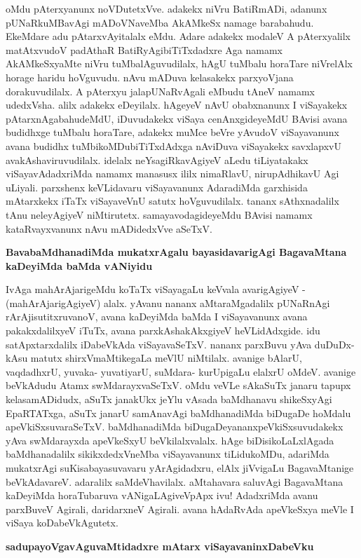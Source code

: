 \noindent
oMdu pAterxyanunx noVDutetxVve. adakekx niVru BatiRmADi, adanunx pUNaRkuMBavAgi mADoVNa\-veMba AkAMkeSx namage barabahudu. EkeMdare adu pAtarxvAyitalalx eMdu. Adare adakekx modaleV A pAterxyalilx matAtxvudoV padAthaR BatiRyAgibiTiTxdadxre Aga namamx AkAMkeSxyaMte niVru tuMbalAguvu\-dilalx, hAgU tuMbalu horaTare niVrelAlx horage haridu hoVguvudu. nAvu mADuva kela\-sakekx parxyoVjana dorakuvudilalx. A pAterxyu jalapUNaRvAgali eMbudu tAneV namamx udedxVsha. alilx adakekx eDeyilalx. hAgeyeV nAvU obabxnanunx I viSayakekx pAtarxnAgabahudeMdU, iDuvudakekx viSaya cenAnx\-gideyeMdU BAvisi avana budidhxge tuMbalu horaTare, adakekx muMce beVre yAvudoV viSayavanunx avana budidhx tuMbikoMDubiTiTxdAdxga nAviDuva viSayakekx savxlapxvU avakAshaviruvudilalx. idelalx neYsa\-giRkavAgiyeV aLedu tiLiyatakakx viSayavAdadxriMda namamx manasusx ililx nimaRlavU, nirupAdhikavU Agi uLiyali. parxshenx keVLidavaru viSayavanunx AdaradiMda garxhisida mAtarxkekx iTaTx viSayaveVnU satutx hoVguvudilalx. tananx sAthxnadalilx tAnu neleyAgiyeV niMtirutetx. samayavodagideyeMdu BAvisi namamx kataRvayxvanunx nAvu mADidedxVve aSeTxV.

{\bigskip
\noindent
{\large\bf BavabaMdhanadiMda mukatxrAgalu bayasidavarigAgi BagavaMtana kaDeyiMda baMda vANiyidu}}\label{page251}
\medskip

\noindent
IvAga mahArAjarigeMdu koTaTx viSayagaLu keVvala avarigAgiyeV - (mahArAjarigAgiyeV) alalx. yAvanu nananx aMtaraMgadalilx pUNaRnAgi rArAjisutitxruvanoV, avana kaDeyiMda baMda I viSayavanunx avana pakakxdalilxyeV iTuTx, avana parxkAshakAkxgiyeV heVLidAdxgide. idu satApxtarxdalilx iDabeVkAda viSayavaSeTxV. nananx parxBuvu yAva duDuDx- kAsu matutx shirxVmaMtikegaLa meVlU niMtilalx. avanige bAlarU, vaqdadhxrU, yuvaka- yuvatiyarU, suMdara- kurUpigaLu elalxrU oMdeV. avanige beVkAdudu Atamx swMdarayxvaSeTxV. oMdu veVLe sAkaSuTx janaru tapupx kelasamADidudx, aSuTx janakUkx jeYlu vAsada baMdhanavu shikeSxyAgi EpaR\-TATxga, aSuTx janarU samAnavAgi baMdhanadiMda biDugaDe hoMdalu apeVkiSxsuvaraSeTxV. baMdhanadiMda biDugaDeyananxpeVkiSxsuvudakekx yAva swMdarayxda apeVkeSxyU beVkilalxvalalx. hAge biDisikoLaLxlAgada baMdha\-nadalilx sikikxdedxVneMba viSayavanunx tiLidukoMDu, adariMda mukatxrAgi suKisabayasuvavaru yArA\-gidadxru, elAlx jiVvigaLu BagavaMtanige beVkAdavareV. adaralilx saMdeVhavilalx. aMtahavara saluvAgi Baga\-vaMtana kaDeyiMda horaTubaruva vANigaLAgiveVpApx ivu! AdadxriMda avanu parxBuveV Agirali, dari\-darxneV Agirali. avana hAdaRvAda apeVkeSxya meVle I viSaya koDabeVkAgutetx.

{\bigskip
\noindent
{\large\bf sadupayoVgavAguvaMtidadxre mAtarx viSayavaninxDabeVku}}\label{page252}
\medskip

